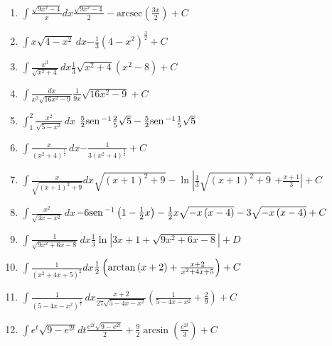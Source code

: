 {\begin{enumerate}
\item {$\displaystyle{\int \frac{\sqrt{9x^{2}-4}}{x}dx}$}{$\frac{\sqrt{9x^{2}-4}}{2}-{\text{arcsec}}\left( \frac{3x}{2}\right) +C$}

\item {$\displaystyle{\int x\sqrt{4-x^{2}}\, dx}$}{$-\frac{1}{3}\left( 4-x^{2}\right) ^{\frac{3}{2}}+C$}

\item {$\displaystyle{\int \frac{x^{3}}{\sqrt{x^{2}+4}}\, dx}$}{$\frac{1}{3}\sqrt{x^{2}+4}\left(
x^{2}-8\right)+C $ }

\item {$\displaystyle{\int \frac{dx}{x^{2}\sqrt{16x^{2}-9}}}$}{$\frac{1}{9x}\sqrt{16x^{2}-9}+C$ }

\item {$\displaystyle{\int_{1}^{2}\frac{x^{2}}{\sqrt{5-x^{2}}}\, dx}$}{ $\frac{5}{2}\text{\rm sen}\,^{-1} \frac{2}{5}\sqrt{5}-\frac{5}{2}\text{\rm sen}\,^{-1} \frac{1}{5}\sqrt{5}$}

\item {$\displaystyle{\int \frac{x}{(x^{2}+4)^{\frac{5}{2}}}\, dx}$}{$-\frac{1}{3\left(x^{2}+4\right) ^{\frac{3}{2}}}+C$ }

\item {$\displaystyle{\int \frac{x}{\sqrt{\left( x+1\right) ^{2}+9}}dx}$}{$\sqrt{\left( x+1\right)^{2}+9}-\ln \left\vert \frac{1}{3}\sqrt{\left( x+1\right)^{2}+9}\right.$ $\left.+\frac{x+1}{3}\right\vert +C$}

\item {$\displaystyle{\int \frac{x^{2}}{\sqrt{4x-x^{2}}}\, dx}$}{$-6\text{\rm sen}\,^{-1} \left( 1-\frac{1}{2}x\right) -\frac{1}{2}x\sqrt{-x\left( x-4\right) }-3\sqrt{-x\left( x-4\right)
}+C $}

\item {$\displaystyle{\int \frac{1}{\sqrt{9x^{2}+6x-8}}\, dx}$}{$\frac{1}{3}\ln \left\vert 3x+1+\sqrt{9x^{2}+6x-8}\right\vert +D$}

\item {$\displaystyle{\int \frac{1}{\left( x^{2}+4x+5\right) ^{2}}dx}$}{$\frac{%
1}{2}\left( \arctan \left( x+2\right) +\frac{x+2}{x^{2}+4x+5}\right) +C$}

\item {$\displaystyle{\int \frac{1}{(5-4x-x^{2})^{\frac{5}{2}}}\, dx}$}{$\frac{x+2}{27\sqrt{5-4x-x^{2}}}\left( \frac{1}{5-4x-x^{2}}+\frac{2}{9}%
\right) +C$}

\item {$\displaystyle{\int e^{t}\sqrt{9-e^{2t}}dt}$}{$\frac{e^{2t}\sqrt{9-e^{2t}}}{2}+\frac{9}{2}\arcsin \left( \frac{e^{2t}}{3}%
\right) +C$}


\end{enumerate}}
